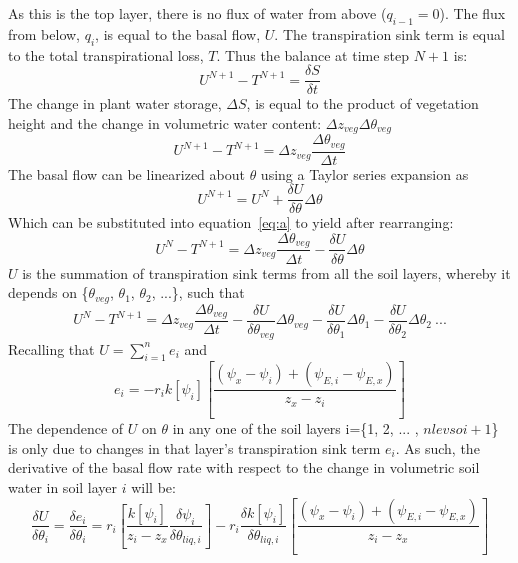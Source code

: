 \documentclass[11pt, oneside]{article}   	%
\begin{document}
As this is the top layer, there is no flux of water from above ($q_{i-1}=0$). The flux from below, $q_i$, is equal to the basal flow, $U$. The transpiration sink term is equal to the total transpirational loss, $T$. Thus the balance at time step $N+1$ is:
\begin{equation} \label{eq:a}
U^{N+1}-T^{N+1}=\dfrac{\delta S}{\delta t}
\end{equation}
The change in plant water storage, $\Delta S$, is equal to the product of vegetation height and the change in volumetric water content: $\Delta z_{veg} \Delta \theta_{veg}$
\begin{equation}
U^{N+1}-T^{N+1}=\Delta z_{veg} \dfrac{\Delta \theta_{veg}}{\Delta t}
\end{equation}
The basal flow can be linearized about $\theta$ using a Taylor series expansion as
\begin{equation}
U^{N+1} = U^{N} + \dfrac{\delta U}{\delta \theta}\Delta\theta
\end{equation}
Which can be substituted into equation~\ref{eq:a} to yield after rearranging:
\begin{equation}
U^{N}-T^{N+1}=\Delta z_{veg} \dfrac{\Delta \theta_{veg}}{\Delta t}-\dfrac{\delta U}{\delta \theta}\Delta\theta
\end{equation}
$U$ is the summation of transpiration sink terms from all the soil layers, whereby it depends on \{$\theta_{veg}$, $\theta_1$, $\theta_2$, ...\}, such that
\begin{equation}
U^{N}-T^{N+1}=\Delta z_{veg} \dfrac{\Delta \theta_{veg}}{\Delta t}-\dfrac{\delta U}{\delta \theta_{veg}}\Delta\theta_{veg}-\dfrac{\delta U}{\delta \theta_1}\Delta\theta_1-\dfrac{\delta U}{\delta \theta_2}\Delta\theta_2 \:...
\end{equation}
Recalling that $U=\sum\limits_{i=1}^n e_i$ and 
\begin{equation}
e_i=-r_{i}k\left[\psi_i\right]\left[\dfrac{\left( \psi_x-\psi_i \right) +\left( \psi_{E,i}-\psi_{E,x} \right)}{z_x-z_i}\right]
\end{equation}
The dependence of $U$ on $\theta$ in any one of the soil layers i=\{1, 2, ... , $nlevsoi+1$\} is only due to changes in that layer's transpiration sink term $e_i$. As such, the derivative of the basal flow rate with respect to the change in volumetric soil water in soil layer $i$ will be:
\begin{equation}
\dfrac{\delta U}{\delta \theta_i}=\dfrac{\delta e_i}{\delta\theta_{i}}=r_{i}\left[\dfrac{k\left[\psi_i\right]}{z_i-z_x}\dfrac{\delta \psi_i}{\delta \theta_{liq,i}}\right]-r_{i}\dfrac{\delta k \left[ \psi_i \right]}{\delta \theta_{liq,i}} \left[ \dfrac{\left( \psi_x - \psi_i \right) + \left( \psi_{E,i}-\psi_{E,x}\right)}{z_i-z_x}\right]
\end{equation}
\end{document}
